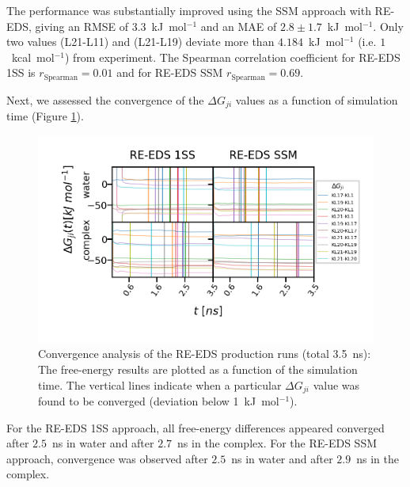 The performance was substantially improved using the SSM approach with RE-EDS, giving an RMSE of $3.3$~kJ~mol$^{-1}$ and an MAE of $2.8 \pm 1.7$~kJ~mol$^{-1}$. 
Only two values (L21-L11) and (L21-L19) deviate more than $4.184$~kJ~mol$^{-1}$ (i.e. $1$~kcal~mol$^{-1}$) from experiment.
The Spearman correlation coefficient for RE-EDS 1SS is $r_{\text{Spearman}}=0.01$ and for RE-EDS SSM $r_{\text{Spearman}}=0.69$.

Next, we assessed the convergence of the $\Delta G_{ji}$ values as a function of simulation time (Figure \ref{SIfig:CHK1_RingOpening_dF_convergence}).
\begin{figure}[h]
\centering
\includegraphics[width=\textwidth]{fig/results/ringOpening/FE/dF_RingOpening_Convergence.png}
\caption{Convergence analysis of the RE-EDS production runs (total 3.5~ns): The free-energy results are plotted as a function of the simulation time. The vertical lines indicate when a particular $\Delta G_{ji}$ value was found to be converged (deviation below 1~kJ~mol$^{-1}$).}
\label{SIfig:CHK1_RingOpening_dF_convergence}
\end{figure}

For the RE-EDS 1SS approach, all free-energy differences appeared converged after $2.5$~ns in water and after $2.7$~ns in the complex. For the RE-EDS SSM approach, convergence was observed after $2.5$~ns in water and after $2.9$~ns in the complex.


